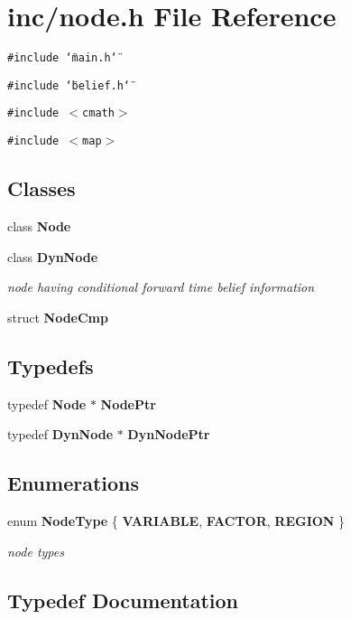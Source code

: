 \section{inc/node.h File Reference}
\label{node_8h}
{\tt \#include \char`\"{}main.h\char`\"{}}\par
{\tt \#include \char`\"{}belief.h\char`\"{}}\par
{\tt \#include $<$cmath$>$}\par
{\tt \#include $<$map$>$}\par
\subsection*{Classes}
\begin{CompactItemize}
\item 
class {\bf Node}
\item 
class {\bf DynNode}
\begin{CompactList}\small\item\em node having conditional forward time belief information \item\end{CompactList}\item 
struct {\bf NodeCmp}
\end{CompactItemize}
\subsection*{Typedefs}
\begin{CompactItemize}
\item 
typedef {\bf Node} $\ast$ {\bf NodePtr}
\item 
typedef {\bf DynNode} $\ast$ {\bf DynNodePtr}
\end{CompactItemize}
\subsection*{Enumerations}
\begin{CompactItemize}
\item 
enum {\bf NodeType} \{ {\bf VARIABLE}, 
{\bf FACTOR}, 
{\bf REGION}
 \}
\begin{CompactList}\small\item\em node types \item\end{CompactList}\end{CompactItemize}


\subsection{Typedef Documentation}

